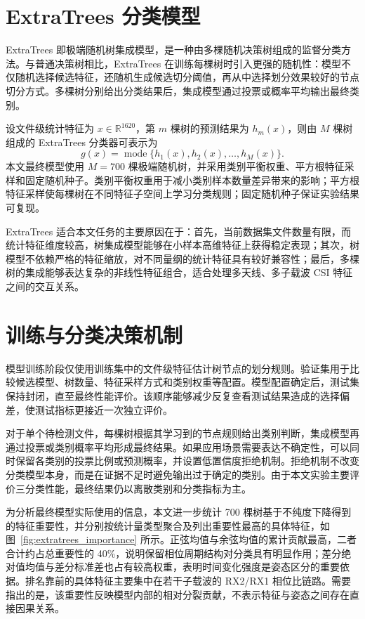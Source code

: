\section{ExtraTrees 分类模型}
ExtraTrees 即极端随机树集成模型，是一种由多棵随机决策树组成的监督分类方法。与普通决策树相比，ExtraTrees 在训练每棵树时引入更强的随机性：模型不仅随机选择候选特征，还随机生成候选切分阈值，再从中选择划分效果较好的节点切分方式。多棵树分别给出分类结果后，集成模型通过投票或概率平均输出最终类别。

设文件级统计特征为 $x\in \mathbb{R}^{1620}$，第 $m$ 棵树的预测结果为 $h_m(x)$，则由 $M$ 棵树组成的 ExtraTrees 分类器可表示为
\begin{equation}
g(x)=\operatorname{mode}\{h_1(x),h_2(x),\ldots,h_M(x)\}.
\end{equation}
本文最终模型使用 $M=700$ 棵极端随机树，并采用类别平衡权重、平方根特征采样和固定随机种子。类别平衡权重用于减小类别样本数量差异带来的影响；平方根特征采样使每棵树在不同特征子空间上学习分类规则；固定随机种子保证实验结果可复现。

ExtraTrees 适合本文任务的主要原因在于：首先，当前数据集文件数量有限，而统计特征维度较高，树集成模型能够在小样本高维特征上获得稳定表现；其次，树模型不依赖严格的特征缩放，对不同量纲的统计特征具有较好兼容性；最后，多棵树的集成能够表达复杂的非线性特征组合，适合处理多天线、多子载波 CSI 特征之间的交互关系。

\section{训练与分类决策机制}
模型训练阶段仅使用训练集中的文件级特征估计树节点的划分规则。验证集用于比较候选模型、树数量、特征采样方式和类别权重等配置。模型配置确定后，测试集保持封闭，直至最终性能评价。该顺序能够减少反复查看测试结果造成的选择偏差，使测试指标更接近一次独立评价。

对于单个待检测文件，每棵树根据其学习到的节点规则给出类别判断，集成模型再通过投票或类别概率平均形成最终结果。如果应用场景需要表达不确定性，可以同时保留各类别的投票比例或预测概率，并设置低置信度拒绝机制。拒绝机制不改变分类模型本身，而是在证据不足时避免输出过于确定的类别。由于本文实验主要评价三分类性能，最终结果仍以离散类别和分类指标为主。

为分析最终模型实际使用的信息，本文进一步统计 700 棵树基于不纯度下降得到的特征重要性，并分别按统计量类型聚合及列出重要性最高的具体特征，如图~\ref{fig:extratrees_importance} 所示。正弦均值与余弦均值的累计贡献最高，二者合计约占总重要性的 40\%，说明保留相位周期结构对分类具有明显作用；差分绝对值均值与差分标准差也占有较高权重，表明时间变化强度是姿态区分的重要依据。排名靠前的具体特征主要集中在若干子载波的 RX2/RX1 相位比链路。需要指出的是，该重要性反映模型内部的相对分裂贡献，不表示特征与姿态之间存在直接因果关系。

